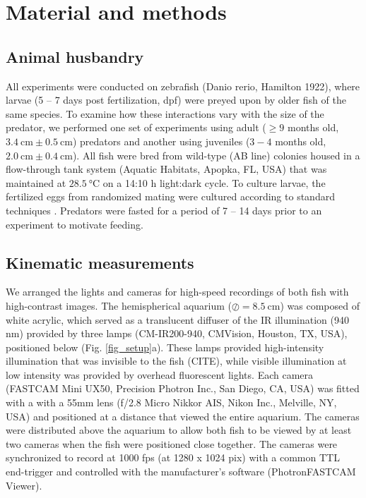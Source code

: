 \documentclass[]{rsos}%
\begin{document}
\section{Material and methods}

\subsection{Animal husbandry}
All experiments were conducted on zebrafish (Danio rerio, Hamilton 1922), where larvae (5 -- 7 days post fertilization, dpf) were preyed upon by older fish of the same species. 
To examine how these interactions vary with the size of the predator, we performed one set of experiments using adult ($\geq 9$ months old, $\SI{3.4}{\cm} \pm \SI{0.5}{\cm}$) predators and another using juveniles  ($3-4$ months old, $\SI{2.0}{\cm}  \pm  \SI{0.4}{\cm}$). 
All fish were bred from wild-type (AB line) colonies housed in a flow-through tank system (Aquatic Habitats, Apopka, FL, USA) that was maintained at $\SI{28.5}{\celsius}$ on a 14:10 h light:dark cycle. 
To culture larvae, the fertilized eggs from randomized mating were cultured according to standard techniques \cite{Westerfield:UXiBrEuA}.
Predators were fasted for a period of 7 -- 14 days prior to an experiment to motivate feeding.

\subsection{Kinematic measurements}
We arranged the lights and cameras for high-speed recordings of both fish with high-contrast images. 
The hemispherical aquarium ($\oslash = \SI{8.5}{\cm}$) was composed of white acrylic, which served as a translucent diffuser of the IR illumination (940 nm) provided by three lamps (CM-IR200-940, CMVision, Houston, TX, USA), positioned below (Fig. \ref{fig_setup}a). 
These lamps provided high-intensity illumination that was invisible to the fish (CITE), while visible illumination at low intensity was provided by overhead fluorescent lights.
Each camera (FASTCAM Mini UX50, Precision Photron Inc., San Diego, CA, USA) was fitted with a with a 55mm lens (f/2.8 Micro Nikkor AIS, Nikon Inc., Melville, NY, USA) and positioned at a distance that viewed the entire aquarium. 
The cameras were distributed above the aquarium to allow both fish to be viewed by at least two cameras when the fish were positioned close together.
The cameras were synchronized to record at 1000 fps (at 1280 x 1024 pix) with a common TTL end-trigger and controlled with the manufacturer's software (PhotronFASTCAM Viewer).
\end{document}
